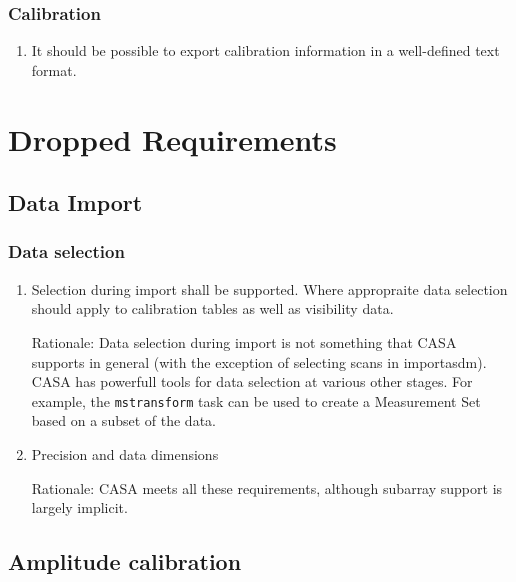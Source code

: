 \documentclass[11pt,a4paper]{article}
\begin{document}
\subsubsection{Calibration}

\begin{enumerate}[subsubseclist]
  
\item It should be possible to export calibration information in a
  well-defined text format.

\end{enumerate}


\section{Dropped Requirements}

\subsection{Data Import}

\subsubsection{Data selection}

\begin{enumerate}[subseclist]

\item Selection during import shall be supported.  Where appropraite
  data selection should apply to calibration tables as well as
  visibility data.

  Rationale: Data selection during import is not something that CASA
  supports in general (with the exception of selecting scans in
  importasdm).  CASA has powerfull tools for data selection at various
  other stages.  For example, the \texttt{mstransform} task can be
  used to create a Measurement Set based on a subset of the data.

\item Precision and data dimensions

  Rationale: CASA meets all these requirements, although subarray
  support is largely implicit.

\end{enumerate}

\subsection{Amplitude calibration}
\end{document}

